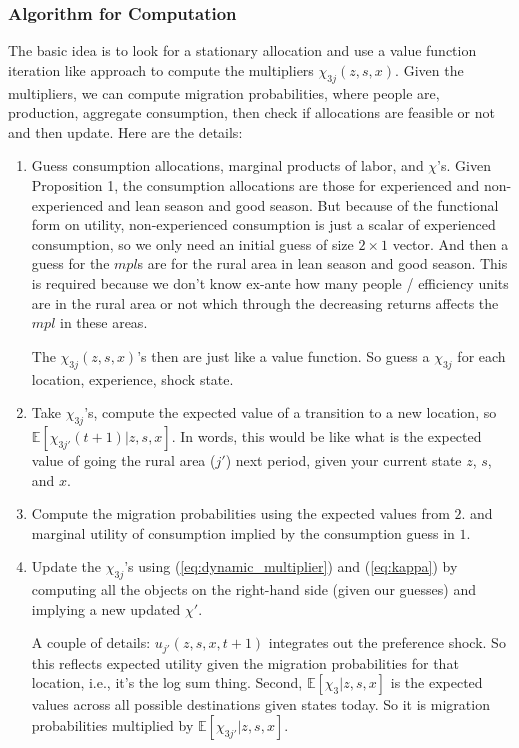 \documentclass[12pt,pdftex]{article}
\begin{document}
\subsubsection{Algorithm for Computation}

The basic idea is to look for a stationary allocation and use a value function iteration like approach to compute the multipliers $\chi_{3j}(z, s, x)$. Given the multipliers, we can compute migration probabilities, where people are, production, aggregate consumption, then check if allocations are feasible or not and then update. Here are the details:
\begin{enumerate}
\item Guess consumption allocations, marginal products of labor, and $\chi$'s. Given Proposition 1, the consumption allocations are those for experienced and non-experienced and lean season and good season. But because of the functional form on utility, non-experienced consumption is just a scalar of experienced consumption, so we only need an initial guess of size $2\times1$ vector. And then a guess for the $mpl$s are for the rural area in lean season and good season. This is required because we don't know ex-ante how many people / efficiency units are in the rural area or not which through the decreasing returns affects the $mpl$ in these areas.

    The $\chi_{3j}(z, s, x)$'s then are just like a value function. So guess a $\chi_{3j}$ for each location, experience, shock state.

\item Take $\chi_{3j}$'s, compute the expected value of a transition to a new location, so $\mathbb{E}\left[\chi_{3j'}(t+1)| z, s, x \right]$. In words, this would be like what is the expected value of going the rural area ($j'$) next period, given your current state $z$, $s$, and $x$.

\item Compute the migration probabilities using the expected values from $2.$ and marginal utility of consumption implied by the consumption guess in $1.$

\item Update the $\chi_{3j}$'s using (\ref{eq:dynamic_multiplier}) and (\ref{eq:kappa}) by computing all the objects on the right-hand side (given our guesses) and implying a new updated $\chi'$.

A couple of details: $u_{j'}(z,s,x,t+1)$ integrates out the preference shock. So this reflects expected utility given the migration probabilities for that location, i.e., it's the log sum thing. Second, $\mathbb{E}\left[\chi_{3} | z, s, x \right]$ is the expected values across all possible destinations given states today. So it is migration probabilities multiplied by $\mathbb{E}\left[\chi_{3j'}| z,s,x \right]$.


\end{enumerate}
\end{document}

